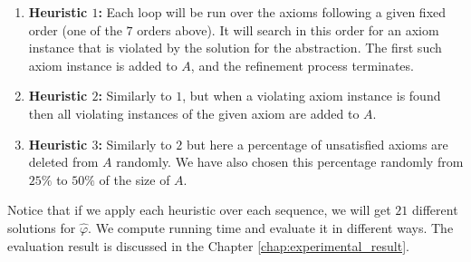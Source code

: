 \begin{enumerate}
\label{item:heuristics}
    \item \textbf{Heuristic $1$:} Each loop will be run over the axioms following a given fixed order (one of the $7$ orders above).
    It will search in this order for an axiom instance that is violated by the solution for the abstraction.
    The first such axiom instance is added to $A$, and the refinement process terminates.
    \item \textbf{Heuristic $2$:} Similarly to $1$, but when a violating axiom instance is found then all violating instances of the given axiom are added to $A$.
    \item \textbf{Heuristic $3$:} Similarly to $2$ but here a percentage of unsatisfied axioms are deleted from $A$ randomly.
    We have also chosen this percentage randomly from $25\%$ to $50\%$ of the size of $A$.
\end{enumerate}

\noindent Notice that if we apply each heuristic over each sequence, we will get $21$ different solutions for $\hat{\varphi}$.
We compute running time and evaluate it in different ways.
The evaluation result is discussed in the Chapter \ref{chap:experimental_result}.



